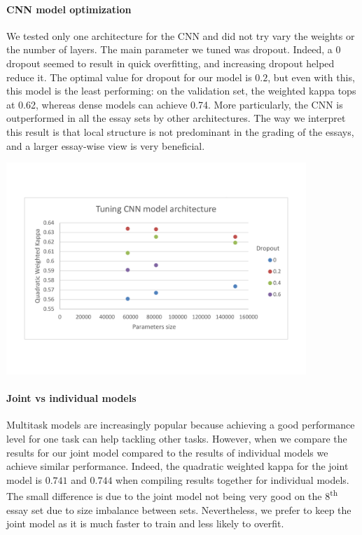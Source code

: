 \documentclass[a4paper,12pt,english]{article}
\begin{document}
\paragraph{CNN model optimization}
We tested only one architecture for the CNN and did not try vary the weights or the number of layers. The main parameter we tuned was dropout. Indeed, a 0 dropout seemed to result in quick overfitting, and increasing dropout helped reduce it. The optimal value for dropout for our model is $0.2$, but even with this, this model is the least performing: on the validation set, the weighted kappa tops at 0.62, whereas dense models can achieve 0.74. More particularly, the CNN is outperformed in all the essay sets by other architectures. The way we interpret this result is that local structure is not predominant in the grading of the essays, and a larger essay-wise view is very beneficial.
\begin{center}
\vspace*{-1.5cm}
\includegraphics[width=0.85\textwidth]{fig/tune_cnn_arch.pdf}
\vspace*{-1.5cm}
\end{center}


\paragraph{Joint vs individual models} Multitask models are increasingly popular because achieving a good performance level for one task can help tackling other tasks. However, when we compare the results for our joint model compared to the results of individual models we achieve similar performance. Indeed, the quadratic weighted kappa for the joint model is $0.741$ and $0.744$ when compiling results together for individual models. The small difference is due to the joint model not being very good on the $8$\textsuperscript{th} essay set due to size imbalance between sets. Nevertheless, we prefer to keep the joint model as it is much faster to train and less likely to overfit.
\end{document}
